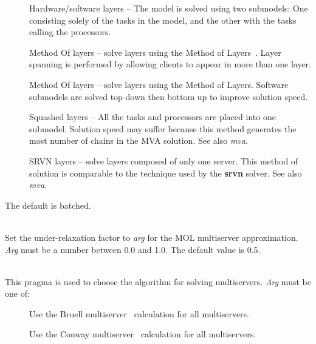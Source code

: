 \begin{description}
\begin{description}
\item[]
Hardware/software layers -- The model is solved using two submodels:
One consisting solely of the tasks in the model, and the other with the tasks calling the processors.
\item[]
Method Of layers -- solve layers using the Method of Layers~\cite{perf:rolia-95-ieeese-mol}. Layer spanning is performed by allowing clients to appear in more than one layer.
\item[]
Method Of layers -- solve layers using the Method of Layers.  Software submodels are solved top-down then bottom up to improve solution speed.
\item[]
Squashed layers -- All the tasks and processors are placed into one submodel.
Solution speed may suffer because this method generates the most number of chains in the MVA solution.  See also \emph{mva}.
\item[]
SRVN layers -- solve layers composed of only one server.
This method of solution is comparable to the technique used by the \textbf{srvn} solver.  See also \emph{mva}.
\end{description}
The default is batched.
\item[\optarg{mol-underrelaxation}{=\emph{arg}}]~\\
Set the under-relaxation factor to \emph{arg} for the MOL multiserver approximation.
\emph{Arg} must be a number between 0.0 and 1.0.
The default value is 0.5.
\item[\optarg{multiserver}{=\emph{arg}}]~\\
This pragma is used to choose the algorithm for solving multiservers.
\emph{Arg} must be one of: 
\begin{description}
\item[]
Use the Bruell multiserver~\cite{queue:bruell-84-peva-load-dependent} calculation for all multiservers.
\item[]
Use the Conway multiserver~\cite{queue:deSouzaeSilva-87,queue:conway-88} calculation for all multiservers.
\item[]

\end{description}
\end{description}
